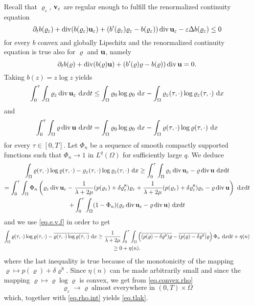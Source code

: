 \documentclass{article}
\DeclareMathOperator{\diver}{div}
\newcommand{\bu}{{\bf u}}
\newcommand{\vu}{\bu}
\newcommand{\bv}{{\bf v}}
\newcommand{\vv}{\bv}
\newcommand{\pat}{\partial_t}
\numberwithin{equation}{section}
\begin{document}
Recall that $\varrho_\varepsilon$, $\vv_\varepsilon$ are regular enough to fulfill the renormalized continuity equation
$$
\pat b(\varrho_\varepsilon) + \diver (b(\varrho_\varepsilon)\vu_\varepsilon) + (b'(\varrho_\varepsilon)\varrho_\varepsilon - b(\varrho_\varepsilon))\diver \vu_\varepsilon - \varepsilon \Delta b(\varrho_\varepsilon)\leq 0
$$
for every $b$ convex and globally Lipschitz and the renormalized continuity equation is true also for $\varrho$ and $\vu$, namely
$$
\pat b(\varrho) + \diver(b(\varrho)\vu) + (b'(\varrho)\varrho - b(\varrho))\diver\vu =0.
$$
Taking $b(z) = z\log  z$ yields
$$
\int_0^\tau\int_\Omega \varrho_\varepsilon\diver \vu_\varepsilon \ {\rm d}x{\rm d}t\leq \int_\Omega \varrho_0\log \varrho_0\ {\rm d}x - \int_\Omega \varrho_\varepsilon(\tau,\cdot)\log \varrho_\varepsilon(\tau,\cdot)\ {\rm d}x
$$
and
$$
\int_0^\tau\int_\Omega \varrho \diver \vu \ {\rm d}x{\rm d}t = \int_\Omega \varrho_0\log \varrho_0 \ {\rm d}x - \int_\Omega \varrho(\tau,\cdot)\log \varrho(\tau,\cdot)\ {\rm d}x
$$
for every $\tau\in [0,T]$. Let $\Phi_n$ be a sequence of smooth compactly supported functions such that $\Phi_n\to 1$ in $L^q(\Omega)$ for sufficiently large $q$. We deduce
\begin{multline*}
\int_\Omega \varrho(\tau,\cdot)\log \varrho(\tau,\cdot) - \varrho_\varepsilon(\tau,\cdot) \log \varrho_\varepsilon(\tau,\cdot)\ {\rm d}x\geq \int_0^\tau\int_\Omega \varrho_\varepsilon\diver\vu_\varepsilon - \varrho\diver \vu\ {\rm d}x{\rm d}t\\
%
 = \int_0^\tau\int_\Omega\Phi_n\left( \varrho_\varepsilon\diver\vu_\varepsilon - \frac 1{\lambda + 2\mu}(p(\varrho_\varepsilon) + \delta\varrho_\varepsilon^8)\varrho_\varepsilon + \frac 1{\lambda + 2\mu}(p(\varrho_\varepsilon) + \delta\varrho_\varepsilon^8)\varrho_\varepsilon - \varrho\diver\vu\right) \ {\rm d}x{\rm d}t\\
%
 + \int_0^\tau \int_\Omega (1-\Phi_n)(\varrho_\varepsilon \diver \vu_\varepsilon - \varrho \diver \vu)\ {\rm d}x{\rm d}t
\end{multline*}
and we use \eqref{eq.e.v.f} in order to get
\begin{multline}\label{eq.convex.rho}
\int_\Omega \varrho(\tau,\cdot)\log \varrho(\tau,\cdot) - \overline{\varrho(\tau,\cdot)\log \varrho(\tau,\cdot)}\ {\rm d}x\geq \frac 1{\lambda + 2\mu} \int_0^\tau\int_\Omega \left(\overline{(p(\varrho) - \delta\varrho^8)\varrho} - \overline{(p(\varrho) - \delta\varrho^8)} \varrho\right)\Phi_n\ {\rm d}x{\rm d}t + \eta(n)\\
%
\geq 0 + \eta(n).
\end{multline}
where the last inequality is true because of the monotonicity of the mapping $\varrho\mapsto p(\varrho) + \delta\varrho^8$. Since $\eta(n)$ can be made arbitrarily small and since the mapping $\varrho\mapsto \varrho\log\varrho$ is convex, we get from \eqref{eq.convex.rho}
$$
\varrho_\varepsilon\to \varrho \ \mbox{almost everywhere in }(0,T)\times\Omega
$$
which, together with \eqref{eq.rho.int} yields \eqref{eq.tlak}.
\end{document}
